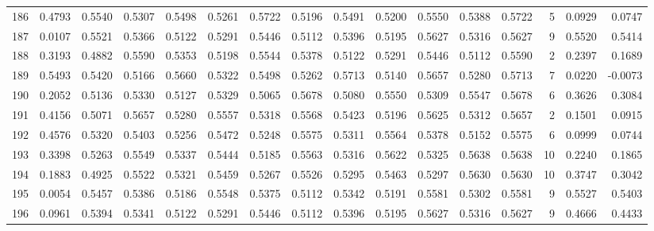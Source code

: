 \begin{tabular}{lrrrrrrrrrrrrrrr}
186 &      0.4793 &  0.5540 &  0.5307 &  0.5498 &  0.5261 &  0.5722 &  0.5196 &  0.5491 &  0.5200 &  0.5550 &   0.5388 &     0.5722 &      5 &                    0.0929 &                     0.0747 \\
187 &      0.0107 &  0.5521 &  0.5366 &  0.5122 &  0.5291 &  0.5446 &  0.5112 &  0.5396 &  0.5195 &  0.5627 &   0.5316 &     0.5627 &      9 &                    0.5520 &                     0.5414 \\
188 &      0.3193 &  0.4882 &  0.5590 &  0.5353 &  0.5198 &  0.5544 &  0.5378 &  0.5122 &  0.5291 &  0.5446 &   0.5112 &     0.5590 &      2 &                    0.2397 &                     0.1689 \\
189 &      0.5493 &  0.5420 &  0.5166 &  0.5660 &  0.5322 &  0.5498 &  0.5262 &  0.5713 &  0.5140 &  0.5657 &   0.5280 &     0.5713 &      7 &                    0.0220 &                    -0.0073 \\
190 &      0.2052 &  0.5136 &  0.5330 &  0.5127 &  0.5329 &  0.5065 &  0.5678 &  0.5080 &  0.5550 &  0.5309 &   0.5547 &     0.5678 &      6 &                    0.3626 &                     0.3084 \\
191 &      0.4156 &  0.5071 &  0.5657 &  0.5280 &  0.5557 &  0.5318 &  0.5568 &  0.5423 &  0.5196 &  0.5625 &   0.5312 &     0.5657 &      2 &                    0.1501 &                     0.0915 \\
192 &      0.4576 &  0.5320 &  0.5403 &  0.5256 &  0.5472 &  0.5248 &  0.5575 &  0.5311 &  0.5564 &  0.5378 &   0.5152 &     0.5575 &      6 &                    0.0999 &                     0.0744 \\
193 &      0.3398 &  0.5263 &  0.5549 &  0.5337 &  0.5444 &  0.5185 &  0.5563 &  0.5316 &  0.5622 &  0.5325 &   0.5638 &     0.5638 &     10 &                    0.2240 &                     0.1865 \\
194 &      0.1883 &  0.4925 &  0.5522 &  0.5321 &  0.5459 &  0.5267 &  0.5526 &  0.5295 &  0.5463 &  0.5297 &   0.5630 &     0.5630 &     10 &                    0.3747 &                     0.3042 \\
195 &      0.0054 &  0.5457 &  0.5386 &  0.5186 &  0.5548 &  0.5375 &  0.5112 &  0.5342 &  0.5191 &  0.5581 &   0.5302 &     0.5581 &      9 &                    0.5527 &                     0.5403 \\
196 &      0.0961 &  0.5394 &  0.5341 &  0.5122 &  0.5291 &  0.5446 &  0.5112 &  0.5396 &  0.5195 &  0.5627 &   0.5316 &     0.5627 &      9 &                    0.4666 &                     0.4433 \\

\end{tabular}
